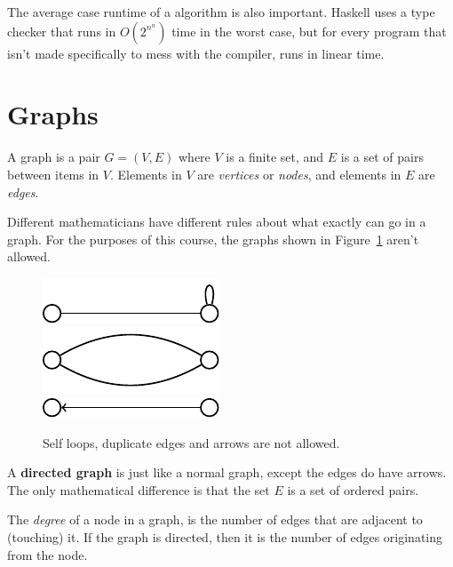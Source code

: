 
The average case runtime of a algorithm is also important. Haskell uses a type
checker that runs in $O(2^{n^n})$ time in the worst case, but for every program
that isn't made specifically to mess with the compiler, runs in linear time.

\section{Graphs}

A graph is a pair $G = (V,E)$ where $V$ is a finite set, and $E$ is a set of
pairs between items in $V$. Elements in $V$ are \textit{vertices} or
\textit{nodes}, and elements in $E$ are \textit{edges}.

Different mathematicians have different rules about what exactly can go in a
graph. For the purposes of this course, the graphs shown in
Figure~\ref{fig:bad-graphs} aren't allowed.

\begin{figure}[h]
  \centering
  \includegraphics{diagrams/self-loops}\\
  \includegraphics{diagrams/multiple-edges}\\
  \includegraphics{diagrams/directed-graph}
  \caption{Self loops, duplicate edges and arrows are not allowed.}
  \label{fig:bad-graphs}
\end{figure}

A \textbf{directed graph} is just like a normal graph, except the edges do have
arrows. The only mathematical difference is that the set $E$ is a set of ordered
pairs.

The \textit{degree} of a node in a graph, is the number of edges that are
adjacent to (touching) it. If the graph is directed, then it is the number of
edges originating from the node.

